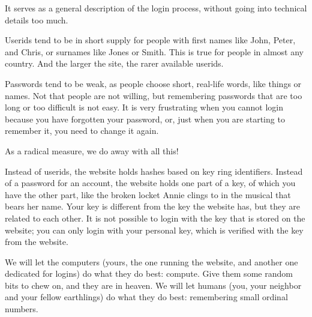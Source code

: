 It serves as a general description of the login process,
without going into technical details too much.

Userids tend to be in short supply for people with first names like John, Peter, and Chris,
or surnames like Jones or Smith.
This is true for people in almost any country.
And the larger the site, the rarer available userids.
\par
Passwords tend to be weak,
as people choose short, real-life words, like things or names.
Not that people are not willing, but remembering passwords that are too long or too difficult is not easy.
It is very frustrating when you cannot login because you have forgotten your password,
or,
just when you are starting to remember it,
you need to change it again.
\par
As a radical measure, we do away with all this!
\par
Instead of userids, the website holds hashes based on key ring identifiers.
Instead of a password for an account, the website holds one part of a key, of which you have the other part,
like the broken locket Annie clings to in the musical that bears her name.
Your key is different from the key the website has, but they are related to each other.
It is not possible to login with the key that is stored on the website;
you can only login with your personal key, which is verified with the key from the website.
\par
We will let the computers
(yours, the one running the website, and another one dedicated for logins)
do what they do best: compute.
Give them some random bits to chew on, and they are in heaven.
We will let humans (you, your neighbor and your fellow earthlings) do what they do best:
remembering small ordinal numbers.

